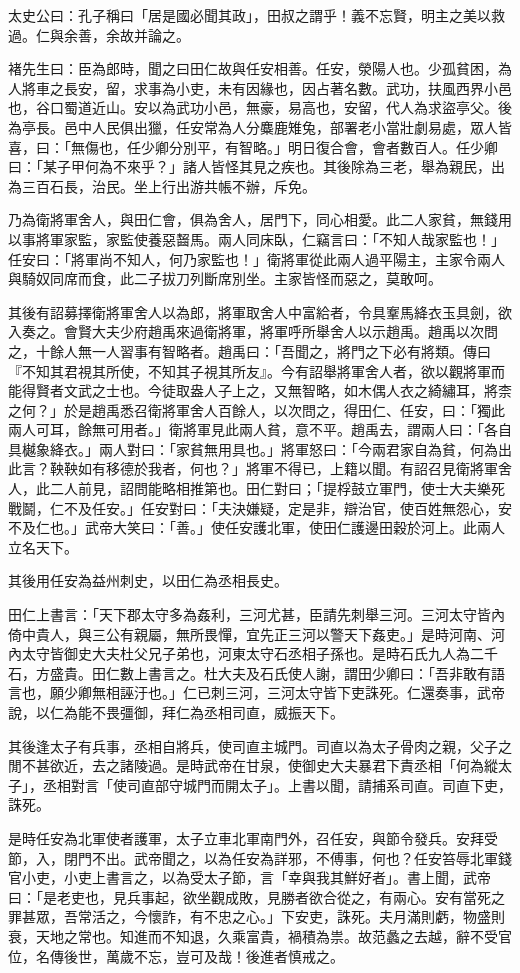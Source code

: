 \begin{pinyinscope}
太史公曰：孔子稱曰「居是國必聞其政」，田叔之謂乎！義不忘賢，明主之美以救過。仁與余善，余故并論之。

褚先生曰：臣為郎時，聞之曰田仁故與任安相善。任安，滎陽人也。少孤貧困，為人將車之長安，留，求事為小吏，未有因緣也，因占著名數。武功，扶風西界小邑也，谷口蜀道近山。安以為武功小邑，無豪，易高也，安留，代人為求盜亭父。後為亭長。邑中人民俱出獵，任安常為人分麋鹿雉兔，部署老小當壯劇易處，眾人皆喜，曰：「無傷也，任少卿分別平，有智略。」明日復合會，會者數百人。任少卿曰：「某子甲何為不來乎？」諸人皆怪其見之疾也。其後除為三老，舉為親民，出為三百石長，治民。坐上行出游共帳不辦，斥免。

乃為衛將軍舍人，與田仁會，俱為舍人，居門下，同心相愛。此二人家貧，無錢用以事將軍家監，家監使養惡齧馬。兩人同床臥，仁竊言曰：「不知人哉家監也！」任安曰：「將軍尚不知人，何乃家監也！」衛將軍從此兩人過平陽主，主家令兩人與騎奴同席而食，此二子拔刀列斷席別坐。主家皆怪而惡之，莫敢呵。

其後有詔募擇衛將軍舍人以為郎，將軍取舍人中富給者，令具鞌馬絳衣玉具劍，欲入奏之。會賢大夫少府趙禹來過衛將軍，將軍呼所舉舍人以示趙禹。趙禹以次問之，十餘人無一人習事有智略者。趙禹曰：「吾聞之，將門之下必有將類。傳曰『不知其君視其所使，不知其子視其所友』。今有詔舉將軍舍人者，欲以觀將軍而能得賢者文武之士也。今徒取盎人子上之，又無智略，如木偶人衣之綺繡耳，將柰之何？」於是趙禹悉召衛將軍舍人百餘人，以次問之，得田仁、任安，曰：「獨此兩人可耳，餘無可用者。」衛將軍見此兩人貧，意不平。趙禹去，謂兩人曰：「各自具樾象絳衣。」兩人對曰：「家貧無用具也。」將軍怒曰：「今兩君家自為貧，何為出此言？鞅鞅如有移德於我者，何也？」將軍不得已，上籍以聞。有詔召見衛將軍舍人，此二人前見，詔問能略相推第也。田仁對曰；「提桴鼓立軍門，使士大夫樂死戰鬬，仁不及任安。」任安對曰：「夫決嫌疑，定是非，辯治官，使百姓無怨心，安不及仁也。」武帝大笑曰：「善。」使任安護北軍，使田仁護邊田穀於河上。此兩人立名天下。

其後用任安為益州刺史，以田仁為丞相長史。

田仁上書言：「天下郡太守多為姦利，三河尤甚，臣請先刺舉三河。三河太守皆內倚中貴人，與三公有親屬，無所畏憚，宜先正三河以警天下姦吏。」是時河南、河內太守皆御史大夫杜父兄子弟也，河東太守石丞相子孫也。是時石氏九人為二千石，方盛貴。田仁數上書言之。杜大夫及石氏使人謝，謂田少卿曰：「吾非敢有語言也，願少卿無相誣汙也。」仁已刺三河，三河太守皆下吏誅死。仁還奏事，武帝說，以仁為能不畏彊御，拜仁為丞相司直，威振天下。

其後逢太子有兵事，丞相自將兵，使司直主城門。司直以為太子骨肉之親，父子之閒不甚欲近，去之諸陵過。是時武帝在甘泉，使御史大夫暴君下責丞相「何為縱太子」，丞相對言「使司直部守城門而開太子」。上書以聞，請捕系司直。司直下吏，誅死。

是時任安為北軍使者護軍，太子立車北軍南門外，召任安，與節令發兵。安拜受節，入，閉門不出。武帝聞之，以為任安為詳邪，不傅事，何也？任安笞辱北軍錢官小吏，小吏上書言之，以為受太子節，言「幸與我其鮮好者」。書上聞，武帝曰：「是老吏也，見兵事起，欲坐觀成敗，見勝者欲合從之，有兩心。安有當死之罪甚眾，吾常活之，今懷詐，有不忠之心。」下安吏，誅死。夫月滿則虧，物盛則衰，天地之常也。知進而不知退，久乘富貴，禍積為祟。故范蠡之去越，辭不受官位，名傳後世，萬歲不忘，豈可及哉！後進者慎戒之。


\end{pinyinscope}